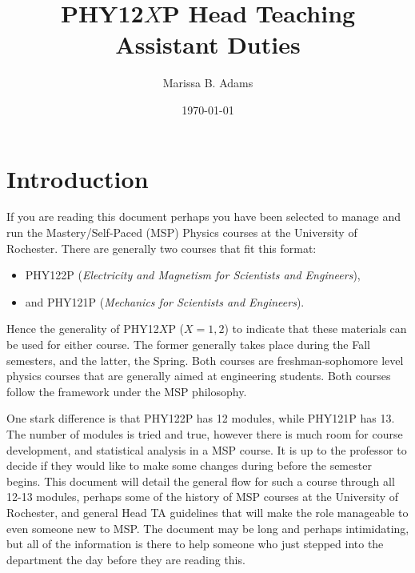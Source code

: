 \documentclass[12pt]{article}
\title{PHY12$X$P Head Teaching Assistant Duties}
\author{Marissa B. Adams}
\date{\today}
\begin{document}
\maketitle
\newpage
\tableofcontents
\newpage

\thispagestyle{fancy}

\section{Introduction}

\indent If you are reading this document perhaps you have been selected to manage and run the Mastery/Self-Paced (MSP) Physics courses at the University of Rochester. There are generally two courses that fit this format: 

\begin{itemize}
	\item PHY122P (\emph{Electricity and Magnetism for Scientists and Engineers}), 
	\item and PHY121P (\emph{Mechanics for Scientists and Engineers}). 
\end{itemize}

\noindent Hence the generality of PHY12$X$P ($X=1,2$) to indicate that these materials can be used for either course. The former generally takes place during the Fall semesters, and the latter, the Spring. Both courses are freshman-sophomore level physics courses that are generally aimed at engineering students. Both courses follow the framework under the MSP philosophy. 

\indent One stark difference is that PHY122P has 12 modules, while PHY121P has 13. The number of modules is tried and true, however there is much room for course development, and statistical analysis in a MSP course. It is up to the professor to decide if they would like to make some changes during before the semester begins. This document will detail the general flow for such a course through all 12-13 modules, perhaps some of the history of MSP courses at the University of Rochester, and general Head TA guidelines that will make the role manageable to even someone new to MSP. The document may be long and perhaps intimidating, but all of the information is there to help someone who just stepped into the department the day before they are reading this. 
\end{document}
